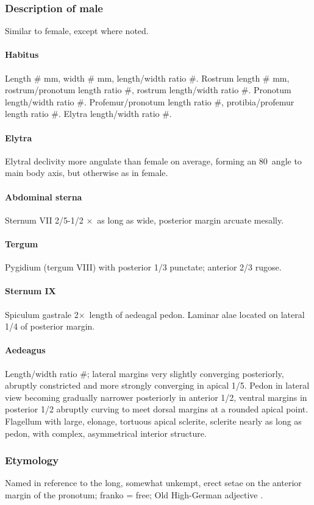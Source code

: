 \documentclass[fleqn,10pt,lineno]{wlpeerj} %
\newcommand{\td}{\textdegree~}
\newcommand{\x}{$\times$~}
\begin{document}
		\subsubsection*{Description of male}
			Similar to female, except where noted.
			\paragraph{Habitus}
				Length \# mm, width \# mm, length/width ratio \#. Rostrum length \# mm, rostrum/pronotum length ratio \#, rostrum length/width ratio \#. Pronotum length/width ratio \#. Profemur/pronotum length ratio \#, protibia/profemur length ratio \#. Elytra length/width ratio \#.
			\paragraph{Elytra}
				Elytral declivity more angulate than female on average, forming an 80\td angle to main body axis, but otherwise as in female.
			\paragraph{Abdominal sterna}
				Sternum VII 2/5-1/2 \x as long as wide, posterior margin arcuate mesally.
			\paragraph{Tergum}
				Pygidium (tergum VIII) with posterior 1/3 punctate; anterior 2/3 rugose.
			\paragraph{Sternum IX}
				Spiculum gastrale 2\x length of aedeagal pedon. Laminar alae located on lateral 1/4 of posterior margin.
			\paragraph{Aedeagus}
				Length/width ratio \#; lateral margins very slightly converging posteriorly, abruptly constricted and more strongly converging in apical 1/5.
				Pedon in lateral view becoming gradually narrower posteriorly in anterior 1/2, ventral margins in posterior 1/2 abruptly curving to meet dorsal margins at a rounded apical point.
				Flagellum with large, elonage, tortuous apical sclerite, sclerite nearly as long as pedon, with complex, asymmetrical interior structure.
		\subsubsection*{Etymology}
			Named in reference to the long, somewhat unkempt, erect setae on the anterior margin of the pronotum; franko = free; Old High-German adjective \citep{brown1956}.
\end{document}

